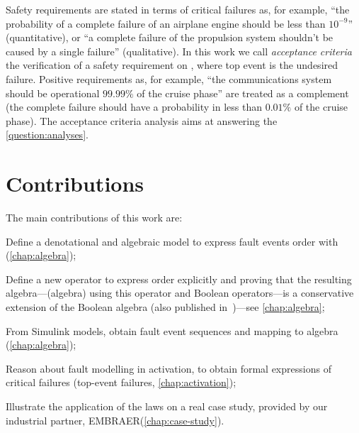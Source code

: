 \documentclass[12pt,openright,twoside,a4paper,oldfontcommands,english,brazil,final]{abntex2}
\theoremstyle{theo}
\newcommand{\EMBRAER}{EMBRAER\xspace}
\newcommand{\simulink}{Simulink\xspace}
\begin{document}
Safety requirements are stated in terms of critical failures as, for example, ``the probability of a complete failure of an airplane engine should be less than $10^{-9}$'' (quantitative), or ``a complete failure of the propulsion system shouldn't be caused by a single failure'' (qualitative).
In this work we call \emph{acceptance criteria} the verification of a safety requirement on , where  top event is the undesired failure.
Positive requirements as, for example, ``the communications system should be operational $99.99\%$ of the cruise phase'' are treated as a complement (the complete failure should have a probability in less than $0.01\%$ of the cruise phase).
The acceptance criteria analysis aims at answering the \ref{question:analyses}.

\section{Contributions}

The main contributions of this work are:

\begin{contrenum}[series=contributions]
  \item Define a denotational and algebraic model to express fault events order with  (\cref{chap:algebra});
  \item Define a new operator to express order explicitly and proving that the resulting algebra---(\ac{algebra}) using this operator and Boolean operators---is a conservative extension of the Boolean algebra (also published in~\cite{DM2016})---see \cref{chap:algebra};
  \item From \simulink models, obtain fault event sequences and mapping to \ac{algebra} (\cref{chap:algebra});
  \item Reason about fault modelling in \ac{activation}, to obtain formal expressions of critical failures (top-event failures, \cref{chap:activation});
  \item Illustrate the application of the laws on a real case study, provided by our industrial partner, \EMBRAER (\cref{chap:case-study}).
\end{contrenum}
\end{document}

